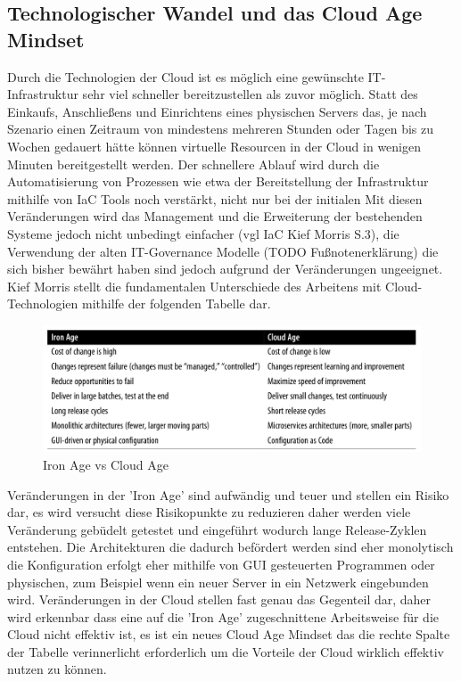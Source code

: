 \subsection{Technologischer Wandel und das Cloud Age Mindset}

Durch die Technologien der Cloud ist es möglich eine gewünschte
IT-Infrastruktur sehr viel schneller bereitzustellen als
zuvor möglich. Statt des Einkaufs, Anschließens und Einrichtens eines
physischen Servers das, je nach Szenario einen Zeitraum von mindestens
mehreren Stunden oder Tagen bis zu Wochen gedauert hätte können
virtuelle Resourcen in der Cloud in wenigen Minuten bereitgestellt werden.
Der schnellere Ablauf wird durch die Automatisierung von Prozessen wie etwa
der Bereitstellung der Infrastruktur mithilfe von IaC Tools noch verstärkt,
nicht nur bei der initialen 
Mit diesen Veränderungen wird das Management und die Erweiterung der
bestehenden Systeme jedoch nicht unbedingt einfacher (vgl IaC Kief Morris S.3),
die Verwendung der alten IT-Governance Modelle (TODO Fußnotenerklärung) die
sich bisher bewährt haben sind jedoch aufgrund der Veränderungen ungeeignet.
Kief Morris stellt die fundamentalen Unterschiede des Arbeitens mit
Cloud-Technologien mithilfe der folgenden Tabelle dar.

\begin{figure}[H]
  \includegraphics[width=1.0\textwidth]{fig/hauptteil/Tabelle_1-2_IaC.png}
  \caption{Iron Age vs Cloud Age}
  \centering
\end{figure}

Veränderungen in der 'Iron Age' sind aufwändig und teuer und stellen ein
Risiko dar, es wird versucht diese Risikopunkte zu reduzieren daher werden
viele Veränderung gebüdelt getestet und eingeführt wodurch lange
Release-Zyklen entstehen. Die Architekturen die dadurch befördert werden
sind eher monolytisch die Konfiguration erfolgt eher mithilfe von GUI
gesteuerten Programmen oder physischen, zum Beispiel wenn ein neuer Server
in ein Netzwerk eingebunden wird. Veränderungen in der Cloud stellen
fast genau das Gegenteil dar, daher wird erkennbar dass eine auf die
'Iron Age' zugeschnittene Arbeitsweise für die Cloud nicht effektiv ist,
es ist ein neues Cloud Age Mindset das die rechte Spalte der Tabelle
verinnerlicht erforderlich um die Vorteile der Cloud
wirklich effektiv nutzen zu können.

